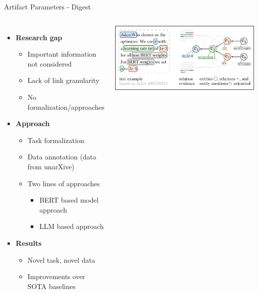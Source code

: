 \documentclass[en,16:9,smallfoot]{sdqbeamer}
\begin{document}
   \begin{frame}{Artifact Parameters - Digest}

   \begin{columns}
        \begin{itemize}
            \item \textbf{Research gap}
            \begin{itemize}
                \item Important information not considered
                \item Lack of link granularity
                \item No formalization/approaches
            \end{itemize}
            \item \textbf{Approach}
            \begin{itemize}
                \item Task formalization
                \item Data annotation {\color{lightgrey}(data from unarXive)}
                \item Two lines of approaches
                \begin{itemize}
                    \item BERT based model approach
                    \item LLM based approach
                \end{itemize}
            \end{itemize}
            \item \textbf{Results}
            \begin{itemize}
                \item Novel task, novel data
                \item Improvements over SOTA baselines
            \end{itemize}
        \end{itemize}
            \includegraphics[width=\linewidth]{imgs/hyperpie_schema}

\end{columns}
\end{frame}
\end{document}
